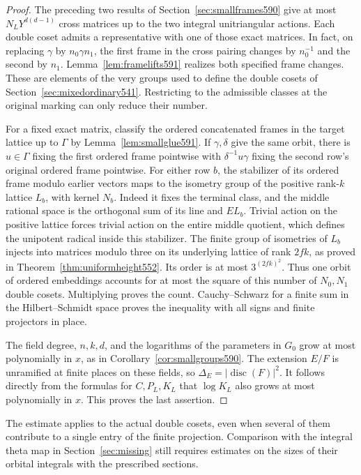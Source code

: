 \documentclass[a4paper,11pt]{article}
\theoremstyle{definition}
\theoremstyle{remark}
\numberwithin{equation}{section}
\begin{document}
\begin{proof}
The preceding two results of Section~\ref{sec:smallframes590}
give at most \(N_LY^{d(d-1)}\) cross matrices up to the two
integral unitriangular actions. Each double coset admits a
representative with one of those exact matrices. In fact, on
replacing \(\gamma\) by \(n_0\gamma n_1\), the first frame
in the cross pairing changes by \(n_0^{-1}\) and the second
by \(n_1\). Lemma~\ref{lem:framelifts591} realizes both
specified frame changes. These are elements of the very
groups used to define the double cosets of
Section~\ref{sec:mixedordinary541}. Restricting to the
admissible classes at the original marking can only reduce
their number.

For a fixed exact matrix, classify the ordered concatenated
frames in the target lattice up to \(\Gamma\) by
Lemma~\ref{lem:smallglue591}. If \(\gamma,\delta\) give the
same orbit, there is \(u\in\Gamma\) fixing the first ordered
frame pointwise with \(\delta^{-1}u\gamma\) fixing the second
row's original ordered frame pointwise. For either row \(b\),
the stabilizer of its ordered frame modulo earlier vectors
maps to the isometry group of the positive rank-\(k\)
lattice \(L_b\), with kernel \(N_b\). Indeed it fixes the
terminal class, and the middle rational space is the
orthogonal sum of its line and \(EL_b\). Trivial action on
the positive lattice forces trivial action on the entire
middle quotient, which defines the unipotent radical inside
this stabilizer. The finite group of isometries of \(L_b\)
injects into matrices modulo three on its underlying lattice
of rank \(2fk\), as proved in
Theorem~\ref{thm:uniformheight552}. Its order is at most
\(3^{(2fk)^2}\). Thus one orbit of ordered embeddings
accounts for at most the square of this number of
\(N_0,N_1\) double cosets. Multiplying proves the count.
Cauchy--Schwarz for a finite sum in the Hilbert--Schmidt
space proves the inequality with all signs and finite
projectors in place.

The field degree, \(n,k,d\), and the logarithms of the
parameters in \(G_0\) grow at most polynomially in \(x\),
as in Corollary~\ref{cor:smallgroups590}. The extension
\(E/F\) is unramified at finite places on these fields,
so \(\Delta_E=|\operatorname{disc}(F)|^2\).
It follows directly from the formulas for \(C,P_L,K_L\)
that \(\log K_L\) also grows at most polynomially in \(x\).
This proves the last assertion.
\end{proof}

The estimate applies to the actual double cosets, even when
several of them contribute to a single entry of the finite
projection. Comparison with the integral theta map in
Section~\ref{sec:missing} still requires estimates on the
sizes of their orbital integrals with the prescribed sections.
\end{document}
